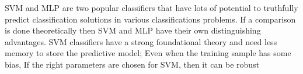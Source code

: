 



SVM and MLP are two popular classifiers that have lots of potential to truthfully predict classification solutions in various classifications problems\cite{Moavenian20103088,Zanaty2012177}. 
If a comparison is done theoretically then SVM and MLP have their own distinguishing advantages. 
SVM classifiers have a strong foundational theory and need less memory to store the predictive model; Even when the training sample has some bias, If the right parameters are chosen for SVM, then it can be robust\cite{auria2008support} 

